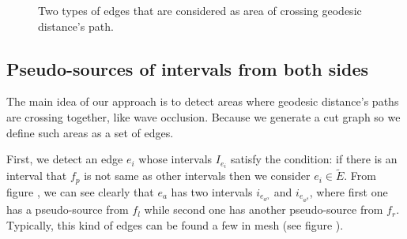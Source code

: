 \documentclass[a4paper,twoside]{article}
\begin{document}
\begin{figure}[h!]
	\centering		
	\hspace{0pt}
	\hspace{0.00\columnwidth}
	\caption[]{Two types of edges that are considered as area of crossing geodesic distance's path.}
	\label{fig:fig-two-type-edges}
\end{figure}


\subsection{Pseudo-sources of intervals from both sides}
\label{subsec:pseudo-sources laid on both side of adjacent faces}
The main idea of our approach is to detect areas where geodesic distance's paths are crossing together, like wave occlusion. Because we generate a cut graph so we define such areas as a set of edges.

First, we detect an edge $e_i$ whose intervals $I_{e_i}$ satisfy the condition: if there is an interval that $f_p$ is not same as other intervals then we consider $e_i \in \tilde{E}$. From figure , we can see clearly that $e_a$ has two intervals $i_{e_{a^\alpha}}$ and $i_{e_{a^\beta}}$, where first one has a pseudo-source from $f_l$ while second one has another pseudo-source from $f_r$. Typically, this kind of edges can be found a few in mesh (see figure ). 
\end{document}
